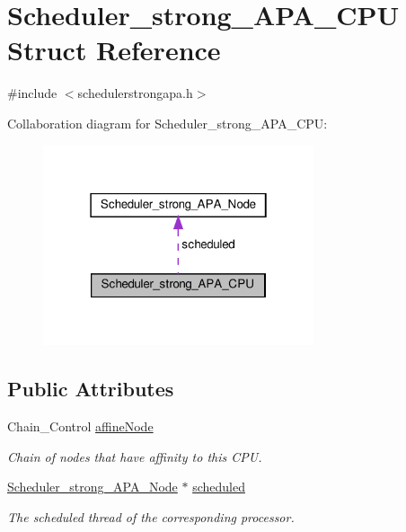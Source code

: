 \hypertarget{structScheduler__strong__APA__CPU}{}\section{Scheduler\+\_\+strong\+\_\+\+A\+P\+A\+\_\+\+C\+PU Struct Reference}
\label{structScheduler__strong__APA__CPU}


{\ttfamily \#include $<$schedulerstrongapa.\+h$>$}



Collaboration diagram for Scheduler\+\_\+strong\+\_\+\+A\+P\+A\+\_\+\+C\+PU\+:
\nopagebreak
\begin{figure}[H]
\begin{center}
\leavevmode
\includegraphics[width=226pt]{structScheduler__strong__APA__CPU__coll__graph}
\end{center}
\end{figure}
\subsection*{Public Attributes}
\begin{DoxyCompactItemize}
\item 
Chain\+\_\+\+Control \hyperlink{structScheduler__strong__APA__CPU_adf4eebd8db4f5b52fdfe7b352c8bddc7}{affine\+Node}
\begin{DoxyCompactList}\small\item\em Chain of nodes that have affinity to this C\+PU. \end{DoxyCompactList}\item 
\hyperlink{structScheduler__strong__APA__Node}{Scheduler\+\_\+strong\+\_\+\+A\+P\+A\+\_\+\+Node} $\ast$ \hyperlink{structScheduler__strong__APA__CPU_aa2f3c81477c08ef4188e5e24f054dffb}{scheduled}
\begin{DoxyCompactList}\small\item\em The scheduled thread of the corresponding processor. \end{DoxyCompactList}\end{DoxyCompactItemize}



